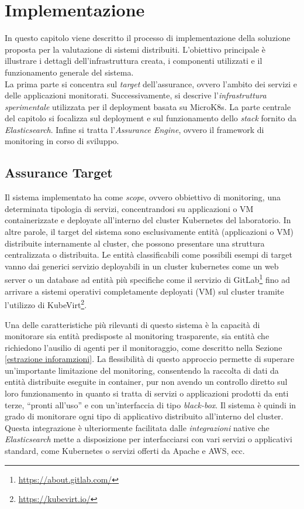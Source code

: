 \chapter{Implementazione}\label{implementazione}

In questo capitolo viene descritto il processo di implementazione della soluzione proposta per la valutazione di sistemi distribuiti. L'obiettivo principale è illustrare i dettagli dell'infrastruttura creata, i componenti utilizzati e il funzionamento generale del sistema. \\
La prima parte si concentra sul \emph{target} dell'assurance, ovvero l'ambito dei servizi e delle applicazioni monitorati.
Successivamente, si descrive l'\emph{infrastruttura sperimentale} utilizzata per il deployment basata su MicroK8s.
La parte centrale del capitolo si focalizza sul deployment e sul funzionamento dello \emph{stack} fornito da \emph{Elasticsearch}.
Infine si tratta l'\emph{Assurance Engine}, ovvero il framework di monitoring in corso di sviluppo.

\section{Assurance Target}
Il sistema implementato ha come \textit{scope}, ovvero obbiettivo di monitoring, una determinata tipologia di servizi, concentrandosi su applicazioni o \gls{VM} containerizzate e deployate all'interno del cluster Kubernetes del laboratorio. In altre parole, il target del sistema sono esclusivamente entità (applicazioni o \gls{VM}) distribuite internamente al cluster, che possono presentare una struttura centralizzata o distribuita.
Le entità classificabili come possibili esempi di target vanno dai generici servizio deployabili in un cluster kubernetes come un web server o un database ad entità più specifiche come il servizio di GitLab\footnote{\url{https://about.gitlab.com/}} fino ad arrivare a sistemi operativi completamente deployati (\gls{VM}) sul cluster tramite l'utilizzo di KubeVirt\footnote{\url{https://kubevirt.io/}}.

Una delle caratteristiche più rilevanti di questo sistema è la capacità di monitorare sia entità predisposte al monitoring trasparente, sia entità che richiedono l'ausilio di agenti per il monitoraggio, come descritto nella Sezione \ref{estrazione inforamzioni}.
La flessibilità di questo approccio permette di superare un'importante limitazione del monitoring, consentendo la raccolta di dati da entità distribuite eseguite in container, pur non avendo un controllo diretto sul loro funzionamento in quanto si tratta di servizi o applicazioni prodotti da enti terze, ``pronti all'uso'' e con un'interfaccia di tipo \textit{black-box}.
Il sistema è quindi in grado di monitorare ogni tipo di applicativo distribuito all'interno del cluster. Questa integrazione è ulteriormente facilitata dalle \emph{integrazioni} native che \emph{Elasticsearch} mette a disposizione per interfacciarsi con vari servizi o applicativi standard, come Kubernetes o servizi offerti da Apache e \gls{AWS}, ecc.

